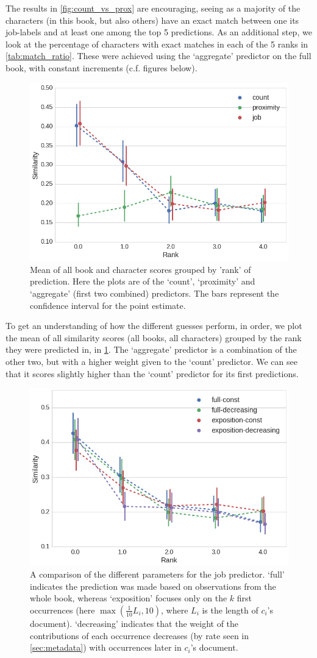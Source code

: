 The results in \cref{fig:count_vs_prox} are encouraging, seeing as a majority of the characters (in this book, but also others) have an exact match between one its job-labels and at least one among the top 5 predictions. As an additional step, we look at the percentage of characters with exact matches in each of the 5 ranks in \cref{tab:match_ratio}. These were achieved using the `aggregate' predictor on the full book, with constant increments (c.f. figures below).

\begin{figure}
\centering
\includegraphics[width=.6\textwidth]{fig/rank_cpa.png}
\caption{Mean of all book and character scores grouped by 'rank' of prediction. Here the plots are of the `count', `proximity' and `aggregate' (first two combined) predictors. The bars represent the confidence interval for the point estimate.}
\label{fig:rank_cpa}
\end{figure}

To get an understanding of how the different guesses perform, in order, we plot the mean of all similarity scores (all books, all characters) grouped by the rank they were predicted in, in \cref{fig:rank_cpa}. The `aggregate' predictor is a combination of the other two, but with a higher weight given to the `count' predictor. We can see that it scores slightly higher than the `count' predictor for its first predictions.

\begin{figure}
\centering
\includegraphics[width=.6\textwidth]{fig/job_params.png}
\caption{A comparison of the different parameters for the job predictor. `full' indicates the prediction was made based on observations from the whole book, whereas `exposition' focuses only on the $k$ first occurrences (here $\max(\frac{1}{10}L_i, 10)$, where $L_i$ is the length of $c_i$'s document). `decreasing' indicates that the weight of the contributions of each occurrence decreases (by rate seen in \cref{sec:metadata}) with occurrences later in $c_i$'s document.}
\label{fig:job_params}
\end{figure}

